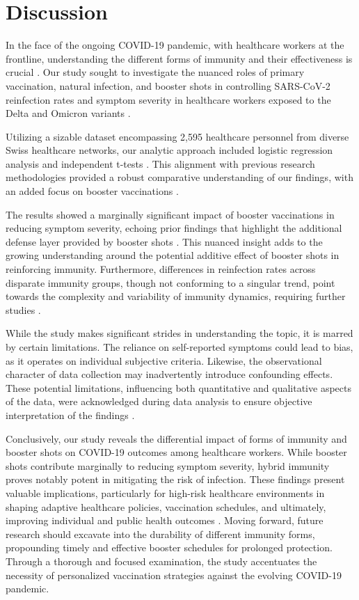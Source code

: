 \documentclass[11pt]{article}
\begin{document}
\section*{Discussion}

In the face of the ongoing COVID-19 pandemic, with healthcare workers at the frontline, understanding the different forms of immunity and their effectiveness is crucial \cite{Cromer2021NeutralisingAT}. Our study sought to investigate the nuanced roles of primary vaccination, natural infection, and booster shots in controlling SARS-CoV-2 reinfection rates and symptom severity in healthcare workers exposed to the Delta and Omicron variants \cite{Levin2021WaningIH}.

Utilizing a sizable dataset encompassing 2,595 healthcare personnel from diverse Swiss healthcare networks, our analytic approach included logistic regression analysis and independent t-tests \cite{Flury2022RiskAS}. This alignment with previous research methodologies provided a robust comparative understanding of our findings, with an added focus on booster vaccinations \cite{Degrace2022DefiningTR, Prez-Als2023PreviousIS}.

The results showed a marginally significant impact of booster vaccinations in reducing symptom severity, echoing prior findings that highlight the additional defense layer provided by booster shots \cite{Chi2022COVID19VU}. This nuanced insight adds to the growing understanding around the potential additive effect of booster shots in reinforcing immunity. Furthermore, differences in reinfection rates across disparate immunity groups, though not conforming to a singular trend, point towards the complexity and variability of immunity dynamics, requiring further studies \cite{Bates2022VaccinationBO, Goldberg2022ProtectionAW}.

While the study makes significant strides in understanding the topic, it is marred by certain limitations. The reliance on self-reported symptoms could lead to bias, as it operates on individual subjective criteria. Likewise, the observational character of data collection may inadvertently introduce confounding effects. These potential limitations, influencing both quantitative and qualitative aspects of the data, were acknowledged during data analysis to ensure objective interpretation of the findings \cite{Antonelli2021RiskFA}.

Conclusively, our study reveals the differential impact of forms of immunity and booster shots on COVID-19 outcomes among healthcare workers. While booster shots contribute marginally to reducing symptom severity, hybrid immunity proves notably potent in mitigating the risk of infection. These findings present valuable implications, particularly for high-risk healthcare environments in shaping adaptive healthcare policies, vaccination schedules, and ultimately, improving individual and public health outcomes \cite{Flury2022RiskAS}. Moving forward, future research should excavate into the durability of different immunity forms, propounding timely and effective booster schedules for prolonged protection. Through a thorough and focused examination, the study accentuates the necessity of personalized vaccination strategies against the evolving COVID-19 pandemic.
\end{document}
